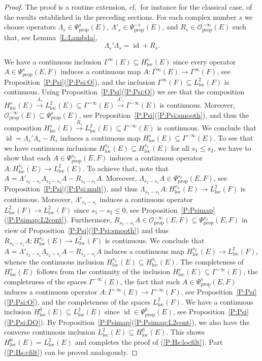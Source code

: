 \documentclass[reqno,12pt]{amsart}
\DeclareMathOperator{\id}{id}
\newcommand\prop{\textrm{prop}}
\newcommand\loc{\textrm{loc}}
\newcommand\itemref[1]{(\ref{#1})}
\theoremstyle{plain}
\theoremstyle{definition}
\begin{document}
\begin{proof}
The proof is a routine extension, cf.\ for instance \cite[Section~\S7]{S01} for the classical case, of the results established in the preceding sections.
For each complex number $s$ we choose operators $\Lambda_s\in\Psi^s_\prop(E)$, $\Lambda'_s\in\Psi^{-s}_\prop(E)$, and $R_s\in\mathcal O^{-\infty}_\prop(E)$ such that, see Lemma~\ref{L:Lambda},
$$
\Lambda_s'\Lambda_s=\id+R_s.
$$ 

We have a continuous inclusion $\Gamma^\infty(E)\subseteq H^s_\loc(E)$ since every operator $A\in\Psi^s_\prop(E,F)$ induces a continuous map $A\colon\Gamma^\infty(E)\to\Gamma^\infty(F)$, see Proposition~\ref{P:Psi}\itemref{P:Psi:O}, and the inclusion $\Gamma^\infty(F)\subseteq L^2_\loc(F)$ is continuous.
Using Proposition~\ref{P:Psi}\itemref{P:Psi:O} we see that the composition
$H^s_\loc(E)\xrightarrow{\Lambda_s}L^2_\loc(E)\subseteq\Gamma^{-\infty}(E)\xrightarrow{\Lambda'_s}\Gamma^{-\infty}(E)$
is continuous.
Moreover, $\mathcal O^{-\infty}_\prop(E)\subseteq\Psi^s_\prop(E)$, see Proposition~\ref{P:Psi}\itemref{P:Psi:smooth}, and thus the composition 
$H^s_\loc(E)\xrightarrow{R_s}L^2_\loc(E)\subseteq\Gamma^{-\infty}(E)$ is continuous.
We conclude that $\id=\Lambda_s'\Lambda_s-R_s$ induces a continuous map $H^s_\loc(E)\subseteq\Gamma^{-\infty}(E)$.
To see that we have continuous inclusions $H^{s_2}_\loc(E)\subseteq H^{s_1}_\loc(E)$ for all $s_1\leq s_2$, we have to show that each $A\in\Psi^{s_1}_\prop(E,F)$ induces a continuous operator $A\colon H^{s_2}_\loc(E)\to L^2_\loc(E)$.
To achieve that, 
note that $A=\Lambda'_{s_2-s_1}\Lambda_{s_2-s_1}A-R_{s_2-s_1}A$.
Moreover, $\Lambda_{s_2-s_1}A\in\Psi^{s_2}_\prop(E,F)$, see Proposition~\ref{P:Psi}\itemref{P:Psi:mult}, and thus $\Lambda_{s_2-s_1}A\colon H^{s_2}_\loc(E)\to L^2_\loc(F)$ is continuous.
Moreover, $\Lambda'_{s_2-s_1}$ induces a continuous operator $L^2_\loc(F)\to L^2_\loc(F)$ since $s_1-s_2\leq0$, see Proposition~\ref{P:Psimap}\itemref{P:Psimap:L2cont}.
Furthermore, $R_{s_2-s_1}A\in\mathcal O^{-\infty}_\prop(E,F)\subseteq\Psi^{s_2}_\prop(E,F)$ in view of Proposition~\ref{P:Psi}\itemref{P:Psi:smooth} and thus $R_{s_2-s_1}A\colon H^{s_2}_\loc(E)\to L^2_\loc(F)$ is continuous.
We conclude that $A=\Lambda'_{s_2-s_1}\Lambda_{s_2-s_1}A-R_{s_2-s_1}A$ induces a continuous map $H^{s_2}_\loc(E)\to L^2_\loc(F)$, whence the continuous inclusion $H^{s_2}_\loc(E)\subseteq H^{s_1}_\loc(E)$.
The completeness of $H^s_\loc(E)$ follows from the continuity of the inclusion $H^s_\loc(E)\subseteq\Gamma^{-\infty}(E)$, the completeness of the spaces $\Gamma^{-\infty}(E)$, the fact that each $A\in\Psi^s_\prop(E,F)$ induces a continuous operator $A\colon\Gamma^{-\infty}(E)\to\Gamma^{-\infty}(F)$, see Proposition~\ref{P:Psi}\itemref{P:Psi:O}, and the completeness of the spaces $L^2_\loc(F)$.
We have a continuous inclusion $H^0_\loc(E)\subseteq L^2_\loc(E)$ since $\id\in\Psi^0_\prop(E)$, see Proposition~\ref{P:Psi}\itemref{P:Psi:DO}.
By Proposition~\ref{P:Psimap}\itemref{P:Psimap:L2cont}, we also have the converse continuous inclusion $L^2_\loc(E)\subseteq H^0_\loc(E)$.
This shows $H^0_\loc(E)=L^2_\loc(E)$ and completes the proof of \itemref{P:Hs:locfilt}.
Part \itemref{P:Hs:cfilt} can be proved analogously.



\end{proof}
\end{document}
